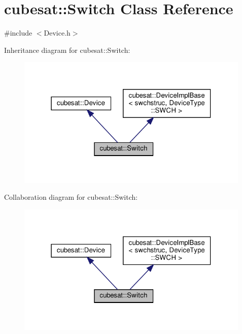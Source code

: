 \hypertarget{classcubesat_1_1Switch}{}\section{cubesat\+:\+:Switch Class Reference}
\label{classcubesat_1_1Switch}


{\ttfamily \#include $<$Device.\+h$>$}



Inheritance diagram for cubesat\+:\+:Switch\+:
\nopagebreak
\begin{figure}[H]
\begin{center}
\leavevmode
\includegraphics[width=316pt]{classcubesat_1_1Switch__inherit__graph}
\end{center}
\end{figure}


Collaboration diagram for cubesat\+:\+:Switch\+:
\nopagebreak
\begin{figure}[H]
\begin{center}
\leavevmode
\includegraphics[width=316pt]{classcubesat_1_1Switch__coll__graph}
\end{center}
\end{figure}
